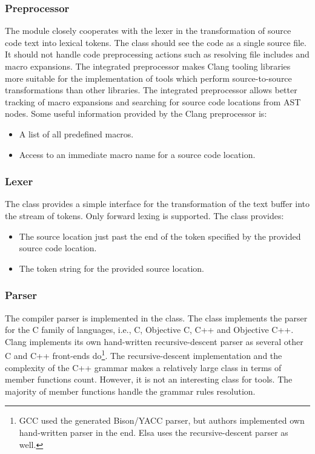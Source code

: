 \subsubsection{Preprocessor}
The  module closely cooperates with the lexer in the transformation of source code text into lexical tokens. The  class should see the code as a single source file. It should not handle code preprocessing actions such as resolving file includes and macro expansions. The integrated preprocessor makes Clang tooling libraries more suitable for the implementation of tools which perform source-to-source transformations than other libraries. The integrated preprocessor allows better tracking of macro expansions and searching for source code locations from AST nodes. Some useful information provided by the Clang preprocessor is:

\begin{itemize}
\item A list of all predefined macros.
\item Access to an immediate macro name for a source code location.
\end{itemize}

\subsubsection{Lexer}
The  class provides a simple interface for the transformation of the text buffer into the stream of tokens. Only forward lexing is supported. The class provides:

\begin{itemize}
\item The source location just past the end of the token specified by the provided source code location.
\item The token string for the provided source location.
\end{itemize}

\subsubsection{Parser}
The compiler parser is implemented in the  class. The class implements the parser for the C family of languages, i.e., C, Objective C, C++ and Objective C++. Clang implements its own hand-written recursive-descent parser as several other C and C++ front-ends do\footnote{GCC used the generated Bison/YACC parser, but authors implemented own hand-written parser in the end. Elsa uses the recursive-descent parser as well.}. The recursive-descent implementation and the complexity of the C++ grammar makes  a relatively large class in terms of member functions count. However, it is not an interesting class for tools. The majority of member functions handle the grammar rules resolution.

